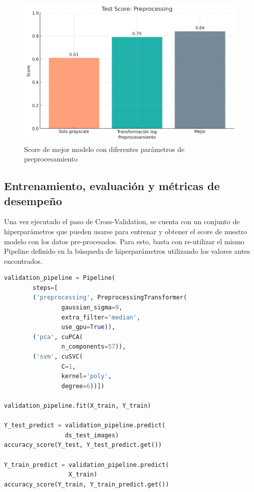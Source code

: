 \documentclass[journal]{IEEEtran}
\begin{document}
\begin{figure}[H]
        \centering
        \includegraphics[width=\linewidth]{figures/preprocessin_gridsearch.png}
        \caption{Score de mejor modelo con diferentes parámetros de preprocesamiento}
        \label{fig:comparativa_preprocesamiento}
\end{figure}

\subsection{Entrenamiento, evaluación y métricas de desempeño}
Una vez ejecutado el paso de Cross-Validation, se cuenta con un conjunto de hiperparámetros que pueden usarse para entrenar y obtener el score de nuestro modelo con los datos pre-procesados. Para esto, basta con re-utilizar el mismo Pipeline definido en la búsqueda de hiperparámetros utilizando los valores antes encontrados.

\begin{lstlisting}[language=Python]
validation_pipeline = Pipeline(
        steps=[
        ('preprocessing', PreprocessingTransformer(
                gaussian_sigma=9,
                extra_filter='median',
                use_gpu=True)),
        ('pca', cuPCA(
                n_components=57)),
        ('svm', cuSVC(
                C=1,
                kernel='poly',
                degree=6))])

validation_pipeline.fit(X_train, Y_train)

Y_test_predict = validation_pipeline.predict(
                 ds_test_images)
accuracy_score(Y_test, Y_test_predict.get())

Y_train_predict = validation_pipeline.predict(
                  X_train)
accuracy_score(Y_train, Y_train_predict.get())
\end{lstlisting}
\end{document}
